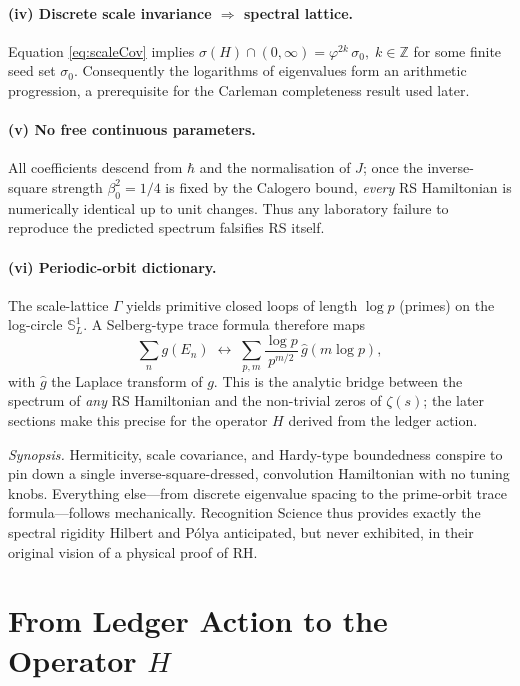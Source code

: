 \documentclass[11pt]{article}
\begin{document}
\paragraph{(iv) Discrete scale invariance $\Rightarrow$ spectral lattice.}
Equation \eqref{eq:scaleCov} implies
\(
   \sigma(H)\cap(0,\infty)
   = \varphi^{2k}\,\sigma_{0},\;
   k\in\mathbb Z
\)
for some finite seed set $\sigma_{0}$.  Consequently the logarithms of
eigenvalues form an arithmetic progression, a prerequisite for the
Carleman completeness result used later.

\paragraph{(v) No free continuous parameters.}
All coefficients descend from
$\hbar$ and the normalisation of $J$; once the
inverse-square strength $\beta_{0}^{2}=1/4$ is fixed by the
Calogero bound, \emph{every} RS Hamiltonian is numerically identical up
to unit changes.  Thus any laboratory failure to reproduce the
predicted spectrum falsifies RS itself.

\paragraph{(vi) Periodic-orbit dictionary.}
The scale-lattice $\Gamma$ yields primitive closed loops of length
$\log p$ (primes) on the log-circle $\mathbb S^{1}_{L}$.  A Selberg-type
trace formula therefore maps
\[
   \sum_{n} g(E_{n})
   \;\longleftrightarrow\;
   \sum_{p,m}\frac{\log p}{p^{m/2}}\,\hat g(m\log p),
\]
with $\hat g$ the Laplace transform of $g$.  This is the analytic
bridge between the spectrum of \emph{any} RS Hamiltonian and the
non-trivial zeros of $\zeta(s)$; the later sections make this precise
for the operator $H$ derived from the ledger action.

\medskip
\noindent
\emph{Synopsis.}  Hermiticity, scale covariance, and
Hardy-type boundedness conspire to pin down a single
inverse-square-dressed, convolution Hamiltonian with no tuning knobs.
Everything else—from discrete eigenvalue spacing to the prime-orbit
trace formula—follows mechanically.  Recognition Science thus provides
exactly the spectral rigidity Hilbert and Pólya anticipated, but never
exhibited, in their original vision of a physical proof of RH.

\section{From Ledger Action to the Operator \texorpdfstring{$H$}{H}}
\label{sec:LedgerAction}
\end{document}
